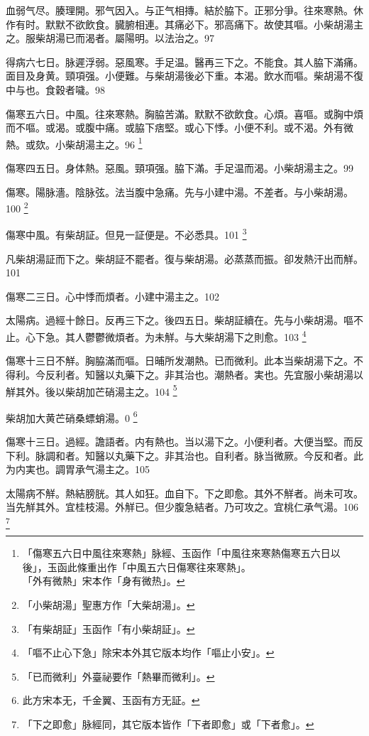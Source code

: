 \documentclass[12pt,twoside,UTF8,b5paper]{ctexbook}
\begin{document}
血弱气尽。腠理開。邪气因入。与正气相摶。結於脇下。正邪分爭。往來寒熱。休作有时。默默不欲飲食。臓腑相連。其痛必下。邪高痛下。故使其嘔。小柴胡湯主之。服柴胡湯已而渴者。屬陽明。以法治之。97

得病六七日。脉遲浮弱。惡風寒。手足温。醫再三下之。不能食。其人脇下滿{痛}。面目及身黄。頸項强。小便難。与柴胡湯後必下重。本渴。飲水而嘔。柴胡{湯}不復中与也。食穀者噦。98

傷寒五六日。中風。往來寒熱。胸脇苦滿。默默不欲飲食。心煩。喜嘔。或胸中煩而不嘔。或渴。或腹中痛。或脇下痞堅。或心下悸。小便不利。或不渴。外有微熱。或欬。小柴胡湯主之。96
	\footnote{「傷寒五六日中風往來寒熱」脉經、玉函作「中風往來寒熱傷寒五六日以後」，玉函此條重出作「中風五六日傷寒往來寒熱」。\\「外有微熱」宋本作「身有微热」。}

傷寒四五日。身{体}熱。惡風。頸項强。脇下滿。手足温而渴。小柴胡湯主之。99

傷寒。陽脉濇。陰脉弦。法当腹中急痛。先与小建中湯。不差者。与小柴胡湯。100
	\footnote{「小柴胡湯」聖惠方作「大柴胡湯」。}

傷寒中風。有柴胡証。但見一証便是。不必悉具。101
	\footnote{「有柴胡証」玉函作「有小柴胡証」。}

凡柴胡湯証而下之。柴胡証不罷者。復与柴胡湯。必蒸蒸而振。卻发熱汗出而觧。101

傷寒二三日。心中悸而煩者。小建中湯主之。102

太陽病。過經十餘日。反再三下之。後四五日。柴胡証續在。先与小柴胡湯。嘔不止。心下急。其人鬱鬱微煩者。为未觧。与大柴胡湯下之則愈。103
	\footnote{「嘔不止心下急」除宋本外其它版本均作「嘔止小安」。}

傷寒十三日不觧。胸脇滿而嘔。日晡所发潮熱{。已}而微利。此本当柴胡湯下之。不得利。今反利者。知醫以丸藥下之。非其治也。潮熱者。実也。先宜服小柴胡湯以觧其外。後以柴胡加芒硝湯主之。104
	\footnote{「已而微利」外臺祕要作「熱畢而微利」。}

柴胡加大黄芒硝桑螵蛸湯。0
	\footnote{此方宋本无，千金翼、玉函有方无証。}

傷寒十三日。過經。譫語者。内有熱也。当以湯下之。小便利者。大便当堅。而反{下}利。脉調和者。知醫以丸藥下之。非其治也。自利者。脉当微厥。今反和者。此为内実也。{調胃}承气湯主之。105

太陽病不觧。熱結膀胱。其人如狂。血自下。下之即愈。其外不觧者。尚未可攻。当先觧其外。{宜桂枝湯。}外觧已。{但}少腹急結者。乃可攻之。宜桃仁承气湯。106
	\footnote{「下之即愈」脉經同，其它版本皆作「下者即愈」或「下者愈」。}
\end{document}
